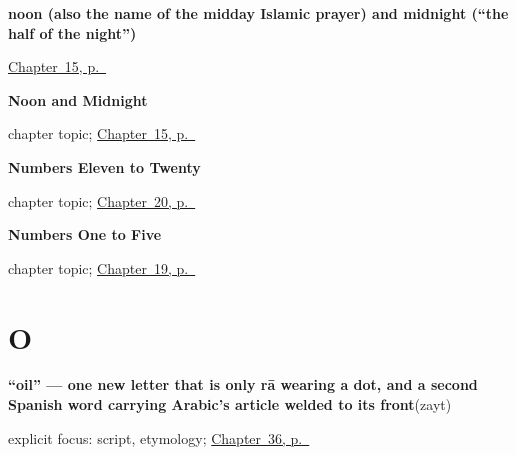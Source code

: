 \noindent\begin{minipage}[t]{\linewidth}
\raggedright
\textbf{noon (also the name of the midday Islamic prayer) and midnight (\textquotedblleft{}the half of the night\textquotedblright{})}\enspace\emph{  }\par
\footnotesize \hyperref[ch:ar-noon-and-midnight]{Chapter~15, p.~\pageref*{ch:ar-noon-and-midnight}}
\end{minipage}\par\smallskip

\noindent\begin{minipage}[t]{\linewidth}
\raggedright
\textbf{Noon and Midnight}\par
\footnotesize chapter topic; \hyperref[ch:ar-noon-and-midnight]{Chapter~15, p.~\pageref*{ch:ar-noon-and-midnight}}
\end{minipage}\par\smallskip

\noindent\begin{minipage}[t]{\linewidth}
\raggedright
\textbf{Numbers Eleven to Twenty}\par
\footnotesize chapter topic; \hyperref[ch:ar-numbers-eleven-to-twenty]{Chapter~20, p.~\pageref*{ch:ar-numbers-eleven-to-twenty}}
\end{minipage}\par\smallskip

\noindent\begin{minipage}[t]{\linewidth}
\raggedright
\textbf{Numbers One to Five}\par
\footnotesize chapter topic; \hyperref[ch:ar-numbers-one-to-five]{Chapter~19, p.~\pageref*{ch:ar-numbers-one-to-five}}
\end{minipage}\par\smallskip

\section*{O}

\noindent\begin{minipage}[t]{\linewidth}
\raggedright
\textbf{\textquotedblleft{}oil\textquotedblright{} — one new letter that is only rā wearing a dot, and a second Spanish word carrying Arabic's article welded to its front}\enspace\emph{}\enspace(zayt)\par
\footnotesize explicit focus: script, etymology; \hyperref[ch:ar-cups-plates-and-more-than-one]{Chapter~36, p.~\pageref*{ch:ar-cups-plates-and-more-than-one}}
\end{minipage}\par\smallskip

